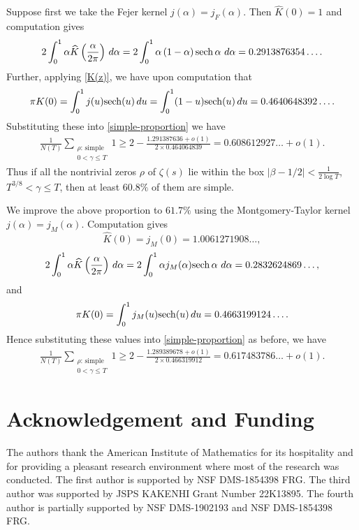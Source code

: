 \documentclass{amsart}
\newcommand{\1}{\mathbbm{1}}
\theoremstyle{remark}
\numberwithin{equation}{section}
\begin{document}
Suppose first we take the Fejer kernel $j(\alpha) = j_F(\alpha)$. Then $\widehat{K}(0)=1$ and computation gives
$$ 2\int_0^1 \alpha\widehat{K}\left(\frac{\alpha}{2\pi}\right)\, d\alpha
= 2\int_0^1 \alpha\left(1-\alpha\right){\rm sech}\,\alpha~ d\alpha = 0.2913876354\ldots. $$
Further, applying \eqref{K(z)}, we have upon computation that
\[ \pi K(0) = \int_0^1 j(u) {\rm sech}(u)\,du
= \int_0^1 (1-u) {\rm sech}(u)\,du = 0.4640648392\ldots. \]
Substituting these into \eqref{simple-proportion} we have
\begin{align*}
\frac1{N(T)}\sum_{\substack{\rho:\,\text{simple} \\ 0<\gamma\le T}} 1
\ge 2 - \frac{1.291387636 + o(1)}{2\times0.464064839}
= 0.608612927\ldots + o(1).
\end{align*}
Thus if all the nontrivial zeros $\rho$ of $\zeta(s)$ lie within the box $|\beta-1/2|<\frac1{2\log T}$, $T^{3/8}<\gamma \le T$, then at least $60.8\%$ of them are simple.


We improve the above proportion to $61.7\%$ using the Montgomery-Taylor kernel $j(\alpha) =j_M(\alpha)$.
Computation gives
$$ \widehat{K}(0)= j_M(0) = 1.0061271908\ldots, $$
$$ 2\int_0^1 \alpha\widehat{K}\left(\frac{\alpha}{2\pi}\right)\, d\alpha
= 2\int_0^1 \alpha j_M(\alpha){\rm sech}\,\alpha~ d\alpha = 0.2832624869\ldots, $$
and
\[ \pi K(0) = \int_0^1 j_M(u) {\rm sech}(u)\,du = 0.4663199124\ldots. \]
Hence substituting these values into \eqref{simple-proportion} as before, we have
\begin{align*}
\frac1{N(T)}\sum_{\substack{\rho:\,\text{simple} \\ 0<\gamma\le T}} 1
\ge 2 - \frac{1.289389678 + o(1)}{2\times0.466319912}
= 0.617483786\ldots + o(1).
\end{align*}


\section*{Acknowledgement and Funding}
The authors thank the American Institute of Mathematics for its hospitality and for providing a pleasant research environment where most of the research was conducted. The first author is supported by NSF DMS-1854398 FRG. The third author was supported by JSPS KAKENHI Grant Number 22K13895. The fourth author is partially supported by NSF DMS-1902193 and NSF DMS-1854398 FRG.



\end{document}
